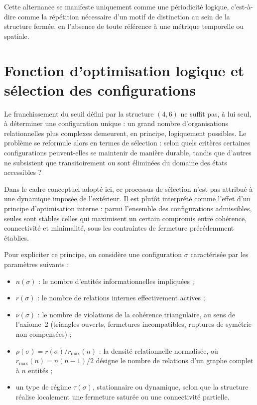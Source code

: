 \documentclass[11pt,a4paper]{article}
\begin{document}
Cette alternance se manifeste uniquement comme une périodicité logique, c’est-à-dire comme la répétition nécessaire d’un motif de distinction au sein de la structure fermée, en l’absence de toute référence à une métrique temporelle ou spatiale.

\section{Fonction d’optimisation logique et sélection des configurations}

Le franchissement du seuil défini par la structure \(\left(4,6\right)\) ne suffit pas, à lui seul, à déterminer une configuration unique : un grand nombre d’organisations relationnelles plus complexes demeurent, en principe, logiquement possibles. Le problème se reformule alors en termes de sélection : selon quels critères certaines configurations peuvent-elles se maintenir de manière durable, tandis que d’autres ne subsistent que transitoirement ou sont éliminées du domaine des états accessibles ?

Dans le cadre conceptuel adopté ici, ce processus de sélection n’est pas attribué à une dynamique imposée de l’extérieur. Il est plutôt interprété comme l’effet d’un principe d’optimisation interne : parmi l’ensemble des configurations admissibles, seules sont stables celles qui maximisent un certain compromis entre cohérence, connectivité et minimalité, sous les contraintes de fermeture précédemment établies.

Pour expliciter ce principe, on considère une configuration \(\sigma\) caractérisée par les paramètres suivants :
\begin{itemize}
  \item \(n\left(\sigma\right)\) : le nombre d’entités informationnelles impliquées ;
  \item \(r\left(\sigma\right)\) : le nombre de relations internes effectivement actives ;
  \item \(\nu\left(\sigma\right)\) : le nombre de violations de la cohérence triangulaire, au sens de l’axiome~2 (triangles ouverts, fermetures incompatibles, ruptures de symétrie non compensées) ;
  \item \(\rho\left(\sigma\right) = r\left(\sigma\right)/r_{\max}\left(n\right)\) : la densité relationnelle normalisée, où \(r_{\max}\left(n\right) = n\left(n-1\right)/2\) désigne le nombre de relations d’un graphe complet à \(n\) entités ;
  \item un type de régime \(\tau\left(\sigma\right)\), stationnaire ou dynamique, selon que la structure réalise localement une fermeture saturée ou une connectivité partielle.
\end{itemize}
\end{document}
